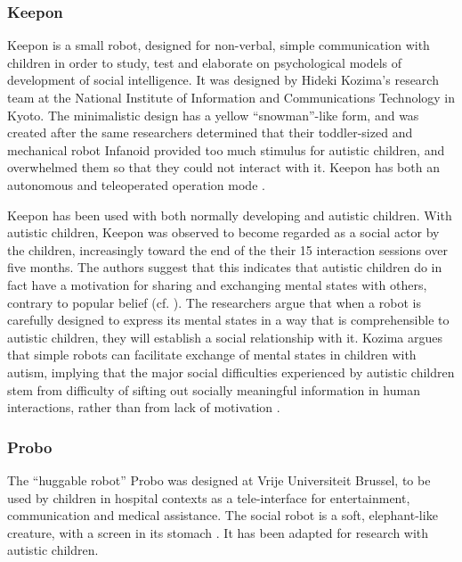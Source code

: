 \subsubsection{Keepon}

Keepon is a small robot, designed for non-verbal, simple communication with children in order to study, test and elaborate on psychological models of development of social intelligence. It was designed by Hideki Kozima's research team at the National Institute of Information and Communications Technology in Kyoto. The minimalistic design has a yellow ``snowman''-like form, and was created after the same researchers determined that their toddler-sized and mechanical robot Infanoid provided too much stimulus for autistic children, and overwhelmed them so that they could not interact with it. Keepon has both an autonomous and teleoperated operation mode \cite{kozima2009keepon}.

Keepon has been used with both normally developing and autistic children. With autistic children, Keepon was observed to become regarded as a social actor by the children, increasingly toward the end of the their 15 interaction sessions over five months. The authors suggest that this indicates that autistic children do in fact have a motivation for sharing and exchanging mental states with others, contrary to popular belief (cf. \cite{carpenter2005role}). The researchers argue that when a robot is carefully designed to express its mental states in a way that is comprehensible to autistic children, they will establish a social relationship with it. Kozima argues that simple robots can facilitate exchange of mental states in children with autism, implying that the major social difficulties experienced by autistic children stem from difficulty of sifting out socially meaningful information in human interactions, rather than from lack of motivation \cite{kozima2009keepon}.


\subsubsection{Probo}

The ``huggable robot'' Probo was designed at Vrije Universiteit Brussel, to be used by children in hospital contexts as a tele-interface for entertainment, communication and medical assistance. The social robot is a soft, elephant-like creature, with a screen in its stomach \cite{saldien2008design}. It has been adapted for research with autistic children.

